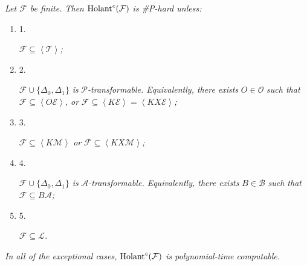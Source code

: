 \emph{Let $\mathcal{F}$ be finite. Then $\textup{{Holant}}^{c}(\mathcal{F})$ is \#P-hard unless:}\par


\begin{enumerate}


\item[] 
1. 


$\mathcal{F}\subseteq\left\langle\mathcal{T}\right\rangle$\emph{;}\par





\item[] 
2. 


$\mathcal{F}\cup\{\Delta_{0},\Delta_{1}\}$\emph{ is }$\mathscr{P}$\emph{-transformable. Equivalently, there exists }$O\in\mathscr{O}$\emph{ such that }$\mathcal{F}\subseteq\left\langle O\mathcal{E}\right\rangle$\emph{, or }$\mathcal{F}\subseteq\left\langle K\mathcal{E}\right\rangle=\left\langle KX\mathcal{E}\right\rangle$\emph{;}\par





\item[] 
3. 


$\mathcal{F}\subseteq\left\langle K\mathcal{M}\right\rangle$\emph{ or }$\mathcal{F}\subseteq\left\langle KX\mathcal{M}\right\rangle$\emph{;}\par





\item[] 
4. 


$\mathcal{F}\cup\{\Delta_{0},\Delta_{1}\}$\emph{ is }$\mathscr{A}$\emph{-transformable. Equivalently, there exists }$B\in\mathcal{B}$\emph{ such that }$\mathcal{F}\subseteq B\mathscr{A}$\emph{;}\par





\item[] 
5. 


$\mathcal{F}\subseteq\mathscr{L}$\emph{.}\par





\end{enumerate}


\emph{In all of the exceptional cases, $\textup{{Holant}}^{c}(\mathcal{F})$ is polynomial-time computable.}\par



